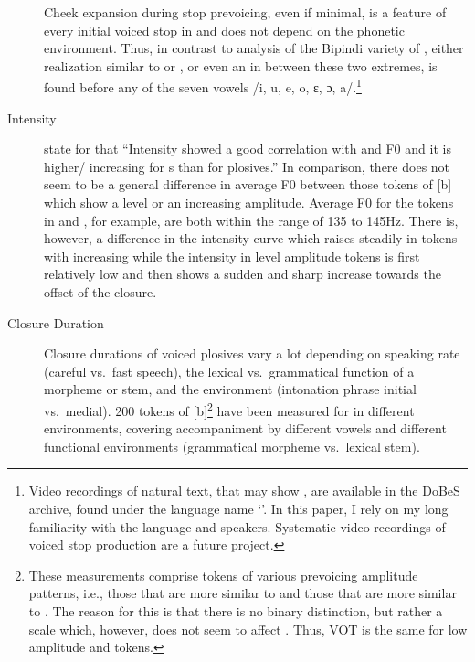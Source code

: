 \documentclass[output=paper]{LSP/langsci}
\begin{document}
\begin{description}
Cheek expansion during stop prevoicing, even if minimal, is a feature of every initial voiced stop in  and does not depend on the phonetic environment. Thus, in contrast to  analysis of the Bipindi variety of , either realization similar to  or , or even an  in between these two extremes, is found before any of the seven vowels /i, u, e, o, ɛ, ɔ, a/.\footnote{Video recordings of natural  text, that may show , are available in the DoBeS archive, found under the language name `'. In this paper, I rely on my long familiarity with the language and speakers. Systematic video recordings of voiced stop production are a future project.} 

\item[Intensity] \citet[75]{Nagano2012} state for  that ``Intensity showed a good correlation with  and F0 and it is higher/ increasing for s than for plosives.'' In comparison, there does not seem to be a general difference in average F0 between those tokens of [b] which show a level or an increasing amplitude. Average F0 for the tokens in  and ,  for example, are both within the range of 135 to 145Hz. There is, however, a difference in the intensity curve which raises steadily in tokens with increasing  while the intensity in level amplitude tokens is first relatively low and then shows a sudden and sharp increase towards the offset of the closure.



\item[Closure Duration] Closure durations of voiced plosives vary a lot depending on speaking rate (careful vs.\ fast speech), the lexical vs.\ grammatical function of a morpheme or stem, and the environment (intonation phrase initial vs.\ medial).
200 tokens of [b]\footnote{These measurements comprise tokens of various prevoicing amplitude patterns, i.e., those that are more similar to  and those that are more similar to . The reason for this is that there is no binary distinction, but rather a scale which, however, does not seem to affect . Thus, VOT is the same for low amplitude and  tokens.} have been measured for  in different environments, covering accompaniment by different vowels and different functional environments (grammatical morpheme vs.\ lexical stem). 


\end{description}
\end{document}
